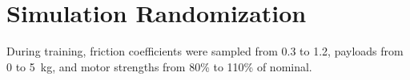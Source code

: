 \chapter{Simulation Randomization}
\label{app:a}

During training, friction coefficients were sampled from 0.3 to 1.2, payloads from 0 to 5~kg,
and motor strengths from 80\% to 110\% of nominal.
